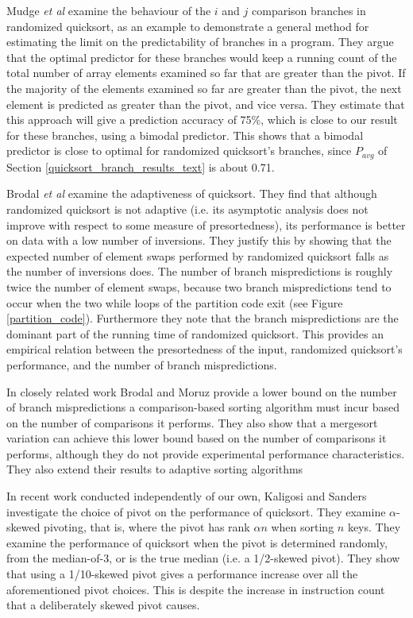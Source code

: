 \documentclass[acmtocl]{acmtrans2m}
\begin{document}
Mudge \textit{et al} \citeyear{Mudge+96} examine the behaviour of the $i$ and $j$
comparison branches in randomized quicksort, as an example to demonstrate a
general method for estimating the limit on the predictability of
branches in a program. They argue that the optimal
predictor for these branches would 
keep a running count of the total
number of array elements examined so far that are
greater than the pivot. If the majority of the elements examined so far
are greater than the pivot, the next element is predicted as greater
than the pivot, and vice versa. They estimate that this approach will give a
prediction accuracy of 75\%, which is close to our
result for these branches, using a bimodal predictor.
This shows that a bimodal predictor is close to optimal
for randomized quicksort's branches, since $P_{avg}$ of Section \ref{quicksort_branch_results_text}
is about 0.71.

Brodal \textit{et al} \citeyear{Brodal+05} examine the adaptiveness of quicksort.
They find that although randomized quicksort is not adaptive (i.e. its asymptotic analysis does not 
improve with respect to some measure of presortedness), its performance
is better on data with a low number of inversions. They justify this by showing 
that the expected number of element swaps performed by randomized quicksort falls as
the number of inversions does. The number of branch mispredictions
is roughly twice the number of element swaps, because two branch mispredictions
tend to occur when the two while loops of the partition code exit (see Figure \ref{partition_code}).
Furthermore they note that the branch mispredictions are the dominant part of the running time of
randomized quicksort. This provides an empirical relation between the presortedness of the input, 
randomized quicksort's performance, and the number of branch mispredictions. 

In closely related work Brodal and Moruz \citeyear{BrodalMoruz05} provide a lower bound on the
number of branch mispredictions a comparison-based sorting algorithm must incur based on the
number of comparisons it performs. They also show that a mergesort variation can achieve this lower
bound based on the number of comparisons it performs, although they do not provide experimental
performance characteristics. They also extend their results to adaptive sorting algorithms

In recent work conducted independently of our own, Kaligosi and Sanders \citeyear{Kaligosi+06}
investigate the choice of pivot on the performance of quicksort. They examine $\alpha$-skewed
pivoting, that is, where the pivot has rank $\alpha n$ when sorting $n$ keys. They examine the performance
of quicksort when the pivot is determined randomly, from the median-of-3, or is the true median
(i.e. a 1/2-skewed pivot). They show that using a 1/10-skewed pivot gives a performance increase 
over all the aforementioned pivot choices. This is despite the increase in instruction count that a 
deliberately skewed pivot causes.
\end{document}
